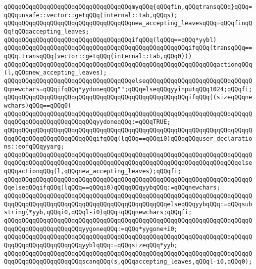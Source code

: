 \newline
\verb|qQQqqQQqqQQqqQQqqQQqqQQqqQQqqQQqqQQqmyqQQq{qQQqfin,qQQqtransqQQq}qQQq=qQQqunsafe::vector::getqQQq(internal::tab,qQQqs);|\newline
\verb|qQQqqQQqqQQqqQQqqQQqqQQqqQQqqQQqqQQqnew_accepting_leavesqQQq=qQQqfinqQQq!qQQqaccepting_leaves;|\newline
\verb|qQQqqQQqqQQqqQQqqQQqqQQqqQQqqQQqqQQqifqQQq(lqQQq==qQQq*yybl)|\newline
\verb|qQQqqQQqqQQqqQQqqQQqqQQqqQQqqQQqqQQqqQQqqQQqqQQqqQQqifqQQq(transqQQq==qQQq.transqQQq(vector::getqQQq(internal::tab,qQQq0)))|\newline
\verb|qQQqqQQqqQQqqQQqqQQqqQQqqQQqqQQqqQQqqQQqqQQqqQQqqQQqqQQqqQQqactionqQQq(l,qQQqnew_accepting_leaves);|\newline
\verb|qQQqqQQqqQQqqQQqqQQqqQQqqQQqqQQqqQQqelseqQQqqQQqqQQqqQQqqQQqqQQqqQQqqQQqnewchars=qQQqifqQQq*yydoneqQQq"";qQQqelseqQQqyyinputqQQq1024;qQQqfi;|\newline
\verb|qQQqqQQqqQQqqQQqqQQqqQQqqQQqqQQqqQQqqQQqqQQqqQQqqQQqifqQQq((sizeqQQqnewchars)qQQq==qQQq0)|\newline
\verb|qQQqqQQqqQQqqQQqqQQqqQQqqQQqqQQqqQQqqQQqqQQqqQQqqQQqqQQqqQQqqQQqqQQqqQQqqQQqqQQqqQQqqQQqqQQqqQQqyydoneqQQq:=qQQqTRUE;|\newline
\verb|qQQqqQQqqQQqqQQqqQQqqQQqqQQqqQQqqQQqqQQqqQQqqQQqqQQqqQQqqQQqqQQqqQQqqQQqqQQqqQQqqQQqqQQqqQQqqQQqifqQQq(lqQQq==qQQqi0)qQQqqQQquser_declarations::eofqQQqyyarg;|\newline
\verb|qQQqqQQqqQQqqQQqqQQqqQQqqQQqqQQqqQQqqQQqqQQqqQQqqQQqqQQqqQQqqQQqqQQqqQQqqQQqqQQqqQQqqQQqqQQqqQQqqQQqqQQqqQQqqQQqqQQqqQQqqQQqqQQqqQQqqQQqelseqQQqactionqQQq(l,qQQqnew_accepting_leaves);qQQqfi;|\newline
\verb|qQQqqQQqqQQqqQQqqQQqqQQqqQQqqQQqqQQqqQQqqQQqqQQqqQQqqQQqqQQqqQQqqQQqqQQqelseqQQqifqQQq(lqQQq==qQQqi0)qQQqqQQqyybqQQq:=qQQqnewchars;|\newline
\verb|qQQqqQQqqQQqqQQqqQQqqQQqqQQqqQQqqQQqqQQqqQQqqQQqqQQqqQQqqQQqqQQqqQQqqQQqqQQqqQQqqQQqqQQqqQQqqQQqqQQqqQQqqQQqqQQqqQQqelseqQQqyybqQQq:=qQQqsubstring(*yyb,qQQqi0,qQQql-i0)qQQq+qQQqnewchars;qQQqfi;|\newline
\verb|qQQqqQQqqQQqqQQqqQQqqQQqqQQqqQQqqQQqqQQqqQQqqQQqqQQqqQQqqQQqqQQqqQQqqQQqqQQqqQQqqQQqqQQqqQQqyygoneqQQq:=qQQq*yygone+i0;|\newline
\verb|qQQqqQQqqQQqqQQqqQQqqQQqqQQqqQQqqQQqqQQqqQQqqQQqqQQqqQQqqQQqqQQqqQQqqQQqqQQqqQQqqQQqqQQqqQQqyyblqQQq:=qQQqsizeqQQq*yyb;|\newline
\verb|qQQqqQQqqQQqqQQqqQQqqQQqqQQqqQQqqQQqqQQqqQQqqQQqqQQqqQQqqQQqqQQqqQQqqQQqqQQqqQQqqQQqqQQqqQQqscanqQQq(s,qQQqaccepting_leaves,qQQql-i0,qQQq0);|\newline
